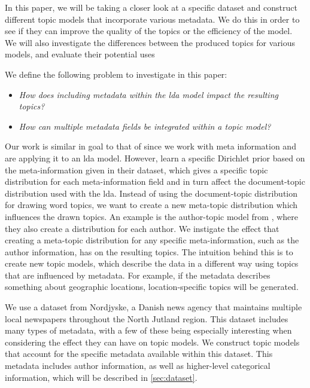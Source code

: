 In this paper, we will be taking a closer look at a specific dataset and construct different topic models that incorporate various metadata.
We do this in order to see if they can improve the quality of the topics or the efficiency of the model.
We will also investigate the differences between the produced topics for various models, and evaluate their potential uses


We define the following problem to investigate in this paper:

\begin{itemize}
	\item \textit{How does including metadata within the \gls{lda} model impact the resulting topics?}
	\item \textit{How can multiple metadata fields be integrated within a topic model?}
\end{itemize}

Our work is similar in goal to that of \citet{MetaLDA2017} since we work with meta information and are applying it to an \gls{lda} model.
However, \citet{MetaLDA2017} learn a specific Dirichlet prior based on the meta-information given in their dataset, which gives a specific topic distribution for each meta-information field and in turn affect the document-topic distribution used with the \gls{lda}.
Instead of using the document-topic distribution for drawing word topics, we want to create a new meta-topic distribution which influences the drawn topics.
An example is the author-topic model from \citet{author_topic_2012}, where they also create a distribution for each author.
We instigate the effect that creating a meta-topic distribution for any specific meta-information, such as the author information, has on the resulting topics.
The intuition behind this is to create new topic models, which describe the data in a different way using topics that are influenced by metadata.
For example, if the metadata describes something about geographic locations, location-specific topics will be generated.

We use a dataset from Nordjyske, a Danish news agency that maintains multiple local newspapers throughout the North Jutland region.
This dataset includes many types of metadata, with a few of these being especially interesting when considering the effect they can have on topic models.
We construct topic models that account for the specific metadata available within this dataset.
This metadata includes author information, as well as higher-level categorical information, which will be described in \autoref{sec:dataset}.

